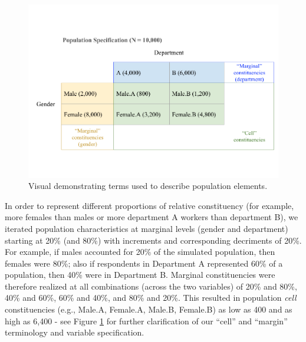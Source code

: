 \documentclass[
  man,mask]{apa7}
\begin{document}
\begin{figure}
\centering
\includegraphics{Simulation-paper2-20200207_files/figure-latex/example1-1.pdf}
\caption{\label{fig:example1}Visual demonstrating terms used to describe population elements.}
\end{figure}

In order to represent different proportions of relative constituency (for example, more females than males or more department A workers than department B), we iterated population characteristics at marginal levels (gender and department) starting at 20\% (and 80\%) with increments and corresponding decriments of 20\%. For example, if males accounted for 20\% of the simulated population, then females were 80\%; also if respondents in Department A represented 60\% of a population, then 40\% were in Department B. Marginal constituencies were therefore realized at all combinations (across the two variables) of 20\% and 80\%, 40\% and 60\%, 60\% and 40\%, and 80\% and 20\%. This resulted in population \emph{cell} constituencies (e.g., Male.A, Female.A, Male.B, Female.B) as low as 400 and as high as 6,400 - see Figure \ref{fig:example1} for further clarification of our ``cell'' and ``margin'' terminology and variable specification.
\end{document}

